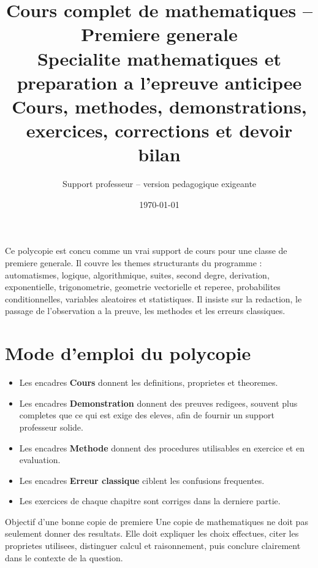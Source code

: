 \documentclass[11pt,a4paper]{article}
\title{\Huge \textbf{Cours complet de mathematiques -- Premiere generale}\\[2mm]
\Large Specialite mathematiques et preparation a l'epreuve anticipee\\[1mm]
\large Cours, methodes, demonstrations, exercices, corrections et devoir bilan}
\author{Support professeur -- version pedagogique exigeante}
\date{\today}
\newcounter{exercice}
\newcounter{corrige}
\begin{document}
\maketitle
\thispagestyle{empty}

\begin{center}
\begin{tcolorbox}[width=0.92\linewidth,colback=softblue,colframe=mainblue,arc=2mm]
Ce polycopie est concu comme un vrai support de cours pour une classe de premiere generale. Il couvre les themes structurants du programme : automatismes, logique, algorithmique, suites, second degre, derivation, exponentielle, trigonometrie, geometrie vectorielle et reperee, probabilites conditionnelles, variables aleatoires et statistiques. Il insiste sur la redaction, le passage de l'observation a la preuve, les methodes et les erreurs classiques.
\end{tcolorbox}
\end{center}

\tableofcontents
\newpage

\section*{Mode d'emploi du polycopie}
\begin{itemize}
  \item Les encadres \textbf{Cours} donnent les definitions, proprietes et theoremes.
  \item Les encadres \textbf{Demonstration} donnent des preuves redigees, souvent plus completes que ce qui est exige des eleves, afin de fournir un support professeur solide.
  \item Les encadres \textbf{Methode} donnent des procedures utilisables en exercice et en evaluation.
  \item Les encadres \textbf{Erreur classique} ciblent les confusions frequentes.
  \item Les exercices de chaque chapitre sont corriges dans la derniere partie.
\end{itemize}

\begin{boiteretenir}{Objectif d'une bonne copie de premiere}
Une copie de mathematiques ne doit pas seulement donner des resultats. Elle doit expliquer les choix effectues, citer les proprietes utilisees, distinguer calcul et raisonnement, puis conclure clairement dans le contexte de la question.
\end{boiteretenir}
\end{document}
